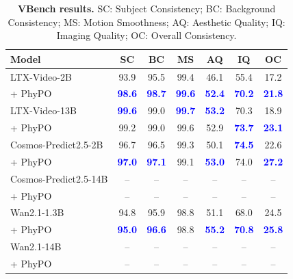 \documentclass{article}
\begin{document}
\begin{table}[H]
\footnotesize
\setlength{\tabcolsep}{3pt}
\centering
\begin{tabular}{lcccccc}
\toprule
\textbf{Model} & SC & BC & MS & AQ & IQ & OC \\
\midrule
LTX-Video-2B
& 93.9 & 95.5 & 99.4 & 46.1 & 55.4 & 17.2 \\
{+ PhyPO}
& \textbf{\textcolor{blue}{98.6}}
& \textbf{\textcolor{blue}{98.7}}
& \textbf{\textcolor{blue}{99.6}}
& \textbf{\textcolor{blue}{52.4}}
& \textbf{\textcolor{blue}{70.2}}
& \textbf{\textcolor{blue}{21.8}} \\
\midrule
LTX-Video-13B
& \textbf{\textcolor{blue}{99.6}}
& 99.0
& \textbf{\textcolor{blue}{99.7}}
& \textbf{\textcolor{blue}{53.2}}
& 70.3
& 18.9 \\
{+ PhyPO}
& 99.2
& 99.0
& 99.6
& 52.9
& \textbf{\textcolor{blue}{73.7}}
& \textbf{\textcolor{blue}{23.1}} \\
\midrule
Cosmos-Predict2.5-2B
& 96.7 & 96.5 & 99.3 & 50.1 & \textbf{\textcolor{blue}{74.5}} & 22.6 \\
{+ PhyPO}
& \textbf{\textcolor{blue}{97.0}}
& \textbf{\textcolor{blue}{97.1}}
& 99.1
& \textbf{\textcolor{blue}{53.0}}
& 74.0
& \textbf{\textcolor{blue}{27.2}} \\
\midrule
Cosmos-Predict2.5-14B
& -- & -- & -- & -- & -- & -- \\
{+ PhyPO}
& -- & -- & -- & -- & -- & -- \\
\midrule
Wan2.1-1.3B
& 94.8
& 95.9
& 98.8
& 51.1
& 68.0
& 24.5 \\
{+ PhyPO}
& \textbf{\textcolor{blue}{95.0}}
& \textbf{\textcolor{blue}{96.6}}
& 98.8
& \textbf{\textcolor{blue}{55.2}}
& \textbf{\textcolor{blue}{70.8}}
& \textbf{\textcolor{blue}{25.8}} \\
\midrule
Wan2.1-14B
& -- & -- & -- & -- & -- & -- \\
{+ PhyPO}
& -- & -- & -- & -- & -- & -- \\
\bottomrule
\end{tabular}
\caption{\textbf{VBench results.}
SC: Subject Consistency; BC: Background Consistency; MS: Motion Smoothness;
AQ: Aesthetic Quality; IQ: Imaging Quality; OC: Overall Consistency.}
\label{tab:suppl_exp_vbench_quality}
\end{table}
\FloatBarrier


\end{document}
